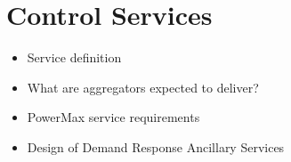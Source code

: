 \chapter{Control Services} %
\label{cha:services}

\begin{itemize}
	\item Service definition
	\item What are aggregators expected to deliver?
	\item PowerMax service requirements
	\item Design of Demand Response Ancillary Services
\end{itemize}

